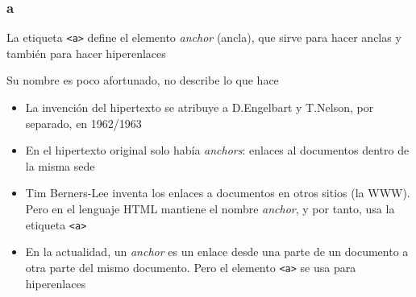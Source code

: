 \documentclass[ucs]{beamer}
\begin{document}
\begin{frame}[fragile]
\frametitle{a}
La etiqueta \verb|<a>| define el elemento \emph{anchor} (ancla), que sirve
para hacer anclas y también para hacer hiperenlaces

Su nombre es poco afortunado, no describe lo que hace

    \begin{itemize}
    \item
La invención del hipertexto se atribuye a 
D.Engelbart y 
T.Nelson, por separado, en 1962/1963

    \item
En el hipertexto original solo había \emph{anchors}: enlaces al documentos dentro
de la misma sede

    \item
Tim Berners-Lee inventa los enlaces a documentos en otros sitios (la WWW). Pero en el lenguaje
HTML mantiene el nombre \emph{anchor}, y por tanto, usa la etiqueta
\verb|<a>| 

    \item
En la actualidad, un \emph{anchor} es un enlace desde una parte de un documento a otra
parte del mismo documento. Pero el elemento
\verb|<a>| 
se usa para hiperenlaces
    \end{itemize}

\end{frame}
\end{document}
